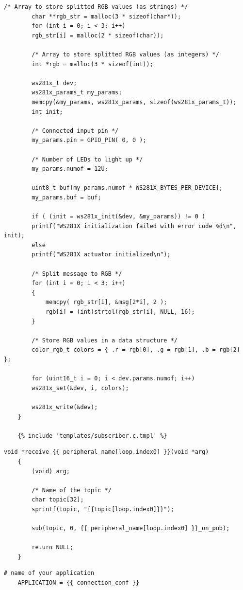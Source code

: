 \begin{appendices}
\begin{lstlisting}[style=CStyle, title={Πρότυπο παραγωγής κώδικα για ενεργοποιητή WS281x}]
		/* Array to store splitted RGB values (as strings) */
		char **rgb_str = malloc(3 * sizeof(char*));
		for (int i = 0; i < 3; i++)
		rgb_str[i] = malloc(2 * sizeof(char));
		
		/* Array to store splitted RGB values (as integers) */
		int *rgb = malloc(3 * sizeof(int));
		
		ws281x_t dev;
		ws281x_params_t my_params;
		memcpy(&my_params, ws281x_params, sizeof(ws281x_params_t));
		int init;
		
		/* Connected input pin */
		my_params.pin = GPIO_PIN( 0, 0 );
		
		/* Number of LEDs to light up */
		my_params.numof = 12U;
		
		uint8_t buf[my_params.numof * WS281X_BYTES_PER_DEVICE];
		my_params.buf = buf;
		
		if ( (init = ws281x_init(&dev, &my_params)) != 0 )
		printf("WS281X initialization failed with error code %d\n", init);
		else
		printf("WS281X actuator initialized\n");
		
		/* Split message to RGB */
		for (int i = 0; i < 3; i++)
		{
			memcpy( rgb_str[i], &msg[2*i], 2 );
			rgb[i] = (int)strtol(rgb_str[i], NULL, 16);
		}
		
		/* Store RGB values in a data structure */
		color_rgb_t colors = { .r = rgb[0], .g = rgb[1], .b = rgb[2] };
		
		for (uint16_t i = 0; i < dev.params.numof; i++) 
		ws281x_set(&dev, i, colors);
		
		ws281x_write(&dev);
	}
	
	{% include 'templates/subscriber.c.tmpl' %}
\end{lstlisting}

\begin{lstlisting}[style=CStyle, title={Πρότυπο παραγωγής κώδικα για την subscriber συνάρτηση ενός ενεργοποιητή}]
	void *receive_{{ peripheral_name[loop.index0] }}(void *arg)
	{
		(void) arg;
		
		/* Name of the topic */
		char topic[32];
		sprintf(topic, "{{topic[loop.index0]}}");
		
		sub(topic, 0, {{ peripheral_name[loop.index0] }}_on_pub);
		
		return NULL;
	}
\end{lstlisting}

\newpage

\begin{lstlisting}[style=MakefileStyle, title={Πρότυπο παραγωγής αρχείου Makefile}]
	# name of your application
	APPLICATION = {{ connection_conf }}
	

\end{lstlisting}
\end{appendices}
